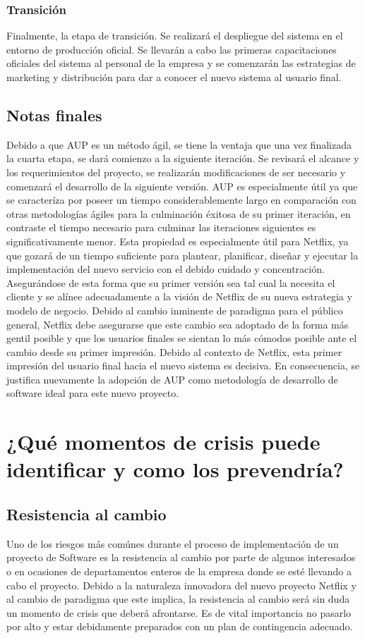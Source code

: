 \documentclass{article}
\begin{document}
\subsubsection{Transición}
Finalmente, la etapa de transición. Se realizará el despliegue del
sistema en el entorno de producción oficial. Se llevarán a cabo las
primeras capacitaciones oficiales del sistema al personal de la
empresa y se comenzarán las estrategias de marketing y distribución
para dar a conocer el nuevo sistema al usuario final.
\subsection{Notas finales}
Debido a que AUP es un método ágil, se tiene la ventaja que 
una vez finalizada la cuarta etapa, se dará comienzo a la siguiente
iteración. Se revisará el alcance y los requerimientos del proyecto,
se realizarán modificaciones de ser necesario y comenzará el
desarrollo de la siguiente versión. AUP es especialmente útil ya que
se caracteríza por poseer un tiempo considerablemente largo en 
comparación con otras metodologías ágiles para la culminación 
éxitosa de su primer iteración, en contraste el tiempo necesario 
para culminar las iteraciones siguientes es significativamente menor.
Esta propiedad es especialmente útil para Netflix, ya que gozará 
de un tiempo suficiente para plantear, planificar, diseñar y ejecutar
la implementación del nuevo servicio con el debido cuidado y 
concentración. Asegurándose de esta forma que su primer versión sea tal
cual la necesita el cliente y se alínee adecuadamente a la visión de Netflix de 
su nueva estrategia y modelo de negocio. Debido al cambio 
inminente de paradigma para el público general, Netflix debe
asegurarse que este cambio sea adoptado de la forma más gentil posible
y que los usuarios finales se sientan lo más cómodos posible ante
el cambio desde su primer impresión. Debido al contexto de Netflix,
esta primer impresión del usuario final hacia el nuevo sistema es
decisiva. En consecuencia, se justifica nuevamente la adopción de AUP
como metodología de desarrollo de software ideal para este nuevo proyecto.

\section{¿Qué momentos de crisis puede identificar y como los
prevendría?}
\subsection{Resistencia al cambio}
Uno de los riesgos más comúnes durante el proceso de implementación
de un proyecto de Software es la resistencia al cambio por parte
de algunos interesados o en ocasiones de departamentos enteros
de la empresa donde se esté llevando a cabo el proyecto. Debido
a la naturaleza innovadora del nuevo proyecto Netflix y al cambio
de paradigma que este implica, la resistencia al cambio será sin
duda un momento de crisis que deberá afrontarse. Es de vital
importancia no pasarlo por alto y estar debidamente preparados con
un plan de contingencia adecuado.
\end{document}
